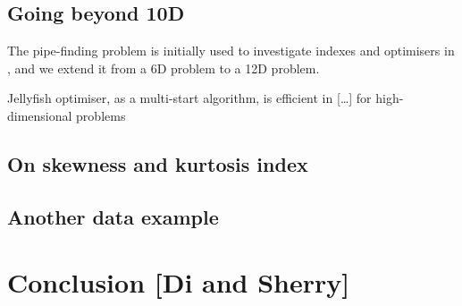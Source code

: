 \documentclass[
  number,
  preprint,
  3p]{elsarticle}
\begin{document}
\hypertarget{going-beyond-10d}{%
\subsection{Going beyond 10D}\label{going-beyond-10d}}

The pipe-finding problem is initially used to investigate indexes and
optimisers in \citet{laa_using_2020}, and we extend it from a 6D problem
to a 12D problem.

Jellyfish optimiser, as a multi-start algorithm, is efficient in
{[}\ldots{]} for high-dimensional problems

\hypertarget{on-skewness-and-kurtosis-index}{%
\subsection{On skewness and kurtosis
index}\label{on-skewness-and-kurtosis-index}}

\hypertarget{another-data-example}{%
\subsection{Another data example}\label{another-data-example}}

\hypertarget{sec-conclusion}{%
\section{Conclusion {[}Di and Sherry{]}}\label{sec-conclusion}}


\renewcommand\refname{References}
  
\end{document}
